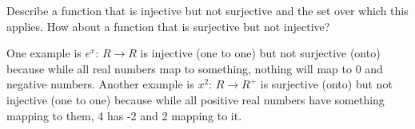 \question Describe a function that is injective but not surjective 
and the set over which this applies. How about a function that is 
surjective but not injective?

\begin{solution}
One example is $e^{x}$: $R \rightarrow R$ is injective (one to one) but not 
surjective (onto) because while all real numbers map to something, 
nothing will map to 0 and negative numbers. \newline
Another example is $x^{2}$: $R \rightarrow R^+$ is surjective (onto) but not injective 
(one to one) because while all positive real numbers have something 
mapping to them, 4 has -2 and 2 mapping to it.
\end{solution}

\clearpage